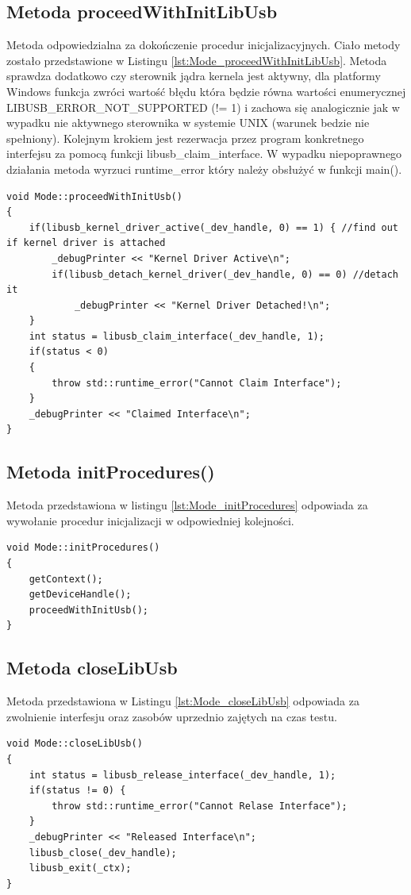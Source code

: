 \documentclass{BscUS}
\begin{document}
\subsection{Metoda proceedWithInitLibUsb}
Metoda odpowiedzialna za dokończenie procedur inicjalizacyjnych. Ciało metody zostało przedstawione w Listingu \ref{lst:Mode_proceedWithInitLibUsb}. Metoda sprawdza dodatkowo czy sterownik jądra kernela jest aktywny, dla platformy Windows funkcja zwróci wartość błędu która będzie równa wartości enumerycznej LIBUSB\_ERROR\_NOT\_SUPPORTED (!= 1) i zachowa się analogicznie jak w wypadku nie aktywnego sterownika w systemie UNIX (warunek bedzie nie spełniony).
\newline
Kolejnym krokiem jest rezerwacja przez program konkretnego interfejsu za pomocą funkcji libusb\_claim\_interface.
\newline
W wypadku niepoprawnego działania metoda wyrzuci runtime\_error który należy obsłużyć  w funkcji main().
\begin{lstlisting}[caption={Metoda Mode::proceedWithInitLibUsb()},label={lst:Mode_proceedWithInitLibUsb}]
void Mode::proceedWithInitUsb()
{
	if(libusb_kernel_driver_active(_dev_handle, 0) == 1) { //find out if kernel driver is attached
		_debugPrinter << "Kernel Driver Active\n";
		if(libusb_detach_kernel_driver(_dev_handle, 0) == 0) //detach it
			_debugPrinter << "Kernel Driver Detached!\n";
	}
	int status = libusb_claim_interface(_dev_handle, 1);
	if(status < 0) 
	{
		throw std::runtime_error("Cannot Claim Interface");
	}
	_debugPrinter << "Claimed Interface\n";
}
\end{lstlisting}

\subsection{Metoda initProcedures()}
Metoda przedstawiona w listingu \ref{lst:Mode_initProcedures} odpowiada za wywołanie procedur inicjalizacji w odpowiedniej kolejności.
\begin{lstlisting}[caption={Metoda Mode::initProcedures()},label={lst:Mode_initProcedures}]
void Mode::initProcedures()
{
	getContext(); 
	getDeviceHandle();
	proceedWithInitUsb();
}
\end{lstlisting}
\subsection{Metoda closeLibUsb}
Metoda przedstawiona w Listingu \ref{lst:Mode_closeLibUsb} odpowiada za zwolnienie interfesju oraz zasobów uprzednio zajętych na czas testu.
\begin{lstlisting}[caption={Metoda Mode::closeLibUsb()},label={lst:Mode_closeLibUsb}]
void Mode::closeLibUsb()
{
	int status = libusb_release_interface(_dev_handle, 1); 
	if(status != 0) {
		throw std::runtime_error("Cannot Relase Interface");
	}
	_debugPrinter << "Released Interface\n";
	libusb_close(_dev_handle);
	libusb_exit(_ctx); 
}
\end{lstlisting}
\end{document}
